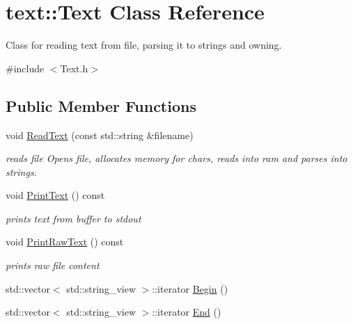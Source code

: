 \hypertarget{classtext_1_1Text}{}\section{text\+:\+:Text Class Reference}
\label{classtext_1_1Text}


Class for reading text from file, parsing it to strings and owning.  




{\ttfamily \#include $<$Text.\+h$>$}

\subsection*{Public Member Functions}
\begin{DoxyCompactItemize}
\item 
void \hyperlink{classtext_1_1Text_abb1307cded199041ad25ecba697e8fa5}{Read\+Text} (const std\+::string \&filename)
\begin{DoxyCompactList}\small\item\em reads file Opens file, allocates memory for chars, reads into ram and parses into strings. \end{DoxyCompactList}\item 
\mbox{\label{classtext_1_1Text_ad148faf27adf9a0cc29a0b2b84bd2293}} 
void \hyperlink{classtext_1_1Text_ad148faf27adf9a0cc29a0b2b84bd2293}{Print\+Text} () const
\begin{DoxyCompactList}\small\item\em prints text from buffer to stdout \end{DoxyCompactList}\item 
\mbox{\label{classtext_1_1Text_a21fe98c861320eb5fddcff8644b2c415}} 
void \hyperlink{classtext_1_1Text_a21fe98c861320eb5fddcff8644b2c415}{Print\+Raw\+Text} () const
\begin{DoxyCompactList}\small\item\em prints raw file content \end{DoxyCompactList}\item 
std\+::vector$<$ std\+::string\+\_\+view $>$\+::iterator \hyperlink{classtext_1_1Text_a4ba572712a8385afd4328c6309259cee}{Begin} ()
\item 
std\+::vector$<$ std\+::string\+\_\+view $>$\+::iterator \hyperlink{classtext_1_1Text_a8fa95460b2eb9bce2d58ffd28e69853c}{End} ()
\end{DoxyCompactItemize}


